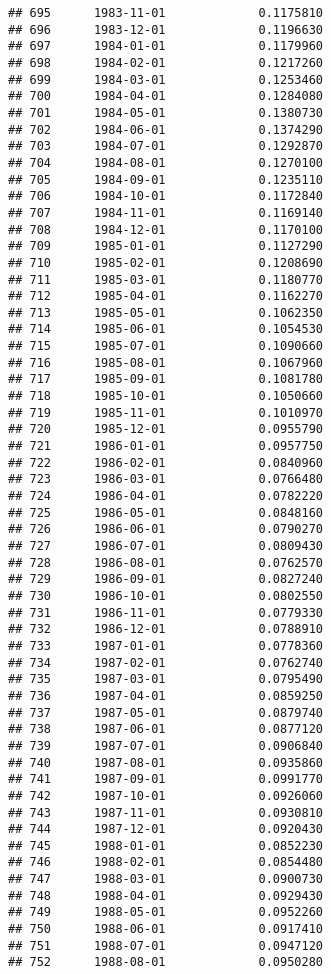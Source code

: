 \documentclass[
]{article}
\begin{document}
\begin{verbatim}
## 695      1983-11-01             0.1175810
## 696      1983-12-01             0.1196630
## 697      1984-01-01             0.1179960
## 698      1984-02-01             0.1217260
## 699      1984-03-01             0.1253460
## 700      1984-04-01             0.1284080
## 701      1984-05-01             0.1380730
## 702      1984-06-01             0.1374290
## 703      1984-07-01             0.1292870
## 704      1984-08-01             0.1270100
## 705      1984-09-01             0.1235110
## 706      1984-10-01             0.1172840
## 707      1984-11-01             0.1169140
## 708      1984-12-01             0.1170100
## 709      1985-01-01             0.1127290
## 710      1985-02-01             0.1208690
## 711      1985-03-01             0.1180770
## 712      1985-04-01             0.1162270
## 713      1985-05-01             0.1062350
## 714      1985-06-01             0.1054530
## 715      1985-07-01             0.1090660
## 716      1985-08-01             0.1067960
## 717      1985-09-01             0.1081780
## 718      1985-10-01             0.1050660
## 719      1985-11-01             0.1010970
## 720      1985-12-01             0.0955790
## 721      1986-01-01             0.0957750
## 722      1986-02-01             0.0840960
## 723      1986-03-01             0.0766480
## 724      1986-04-01             0.0782220
## 725      1986-05-01             0.0848160
## 726      1986-06-01             0.0790270
## 727      1986-07-01             0.0809430
## 728      1986-08-01             0.0762570
## 729      1986-09-01             0.0827240
## 730      1986-10-01             0.0802550
## 731      1986-11-01             0.0779330
## 732      1986-12-01             0.0788910
## 733      1987-01-01             0.0778360
## 734      1987-02-01             0.0762740
## 735      1987-03-01             0.0795490
## 736      1987-04-01             0.0859250
## 737      1987-05-01             0.0879740
## 738      1987-06-01             0.0877120
## 739      1987-07-01             0.0906840
## 740      1987-08-01             0.0935860
## 741      1987-09-01             0.0991770
## 742      1987-10-01             0.0926060
## 743      1987-11-01             0.0930810
## 744      1987-12-01             0.0920430
## 745      1988-01-01             0.0852230
## 746      1988-02-01             0.0854480
## 747      1988-03-01             0.0900730
## 748      1988-04-01             0.0929430
## 749      1988-05-01             0.0952260
## 750      1988-06-01             0.0917410
## 751      1988-07-01             0.0947120
## 752      1988-08-01             0.0950280

\end{verbatim}
\end{document}
